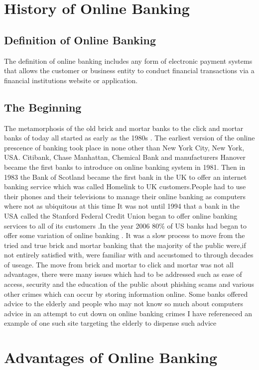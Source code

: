 \section{History of Online Banking}
\subsection{Definition of Online Banking}
The definition of online banking includes any form of electronic payment systems
that allows the customer or business entity to conduct financial transactions
via a financial institutions website or application.
\subsection{The Beginning}
The metamorphosis of the old brick and mortar banks to the click and mortar banks of
today all started as early as the 1980s \cite{HistoryBanking}. The earliest version
of the online prescence of banking took place in none other than New York City, New York,
USA.  Citibank, Chase Manhattan, Chemical Bank and manufacturers Hanover became the
first banks to introduce on online banking system in 1981.\cite{HistoryBanking}
Then in 1983 the Bank of Scotland became the first bank in the UK to offer an
internet banking service which was called Homelink to UK customers.People had to
use their phones and their televisions to manage their online banking as computers
where not as ubiquitous at this time \cite{HistoryBanking} It was not until 1994
that a bank in the USA called the Stanford Federal Credit Union began to offer online
banking services to all of its customers \cite{HistoryBanking}.In the year 2006 80\% of US banks had began to offer
some variation of online banking \cite{HistoryBanking}.
It was a slow process to move from the tried and true brick and mortar banking that the majority of the public
were,if not entirely satisfied with, were familiar with and accustomed to through decades of
useage. The move from brick and mortar to click and mortar was not all advantages, there were many issues
which had to be addressed such as ease of access, security and the education of the public about phishing scams
and various other crimes which can occur by storing information online.  Some banks offered advice to the elderly
and people who may not know so much about computers advice in an attempt to cut down on online banking crimes I have refereneced an example of one such site targeting the elderly to dispense such advice \cite{BOIElderly}
\section{Advantages of Online Banking}
